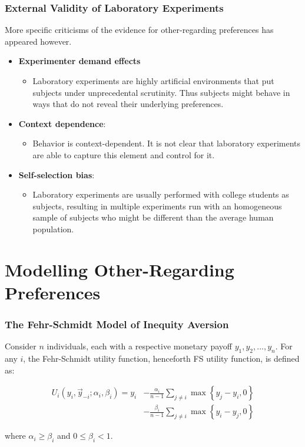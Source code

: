 \documentclass{beamer}
\begin{document}
\begin{frame}
\frametitle{External Validity of Laboratory Experiments}

More specific criticisms of the evidence for other-regarding preferences has appeared however. 

\begin{itemize}
\item \textbf{Experimenter demand effects}
\begin{itemize}
\item Laboratory experiments are highly artificial environments that put subjects under unprecedental scrutinity. Thus subjects might behave in ways that do not reveal their underlying preferences.
\end{itemize}
\item \textbf{Context dependence}:
\begin{itemize}
\item Behavior is context-dependent. It is not clear that laboratory experiments are able to capture this element and control for it.
\end{itemize}
\item \textbf{Self-selection bias}:
\begin{itemize}
\item Laboratory experiments are usually performed with college students as subjects, resulting in multiple experiments run with an homogeneous sample of subjects who might be different than the average human population.
\end{itemize}
\end{itemize}
\end{frame}

\section{Modelling Other-Regarding Preferences}


\begin{frame}
	\frametitle{The Fehr-Schmidt Model of Inequity Aversion}
	
	Consider $n$ individuals, each with a respective monetary payoff $y_1,y_2,...,y_n$. For any $i$, the Fehr-Schmidt utility function, henceforth FS utility function, is defined as:
	
	\begin{equation}
	\begin{split}
	U_i\left(y_i,\vec{y}_{-i};\alpha_i,\beta_i\right) = y_i & -  \frac{\alpha_i}{n-1} \sum_{j\neq i} \max \left \{ y_j - y_i,0 \right \} \\
	& - \frac{\beta_i}{n-1} \sum_{j\neq i} \max \left \{ y_i - y_j,0 \right \}
	\end{split}
	\end{equation}

where $\alpha_i \geq \beta_i$ and $0 \leq \beta_i <1$.

\end{frame}
\end{document}
